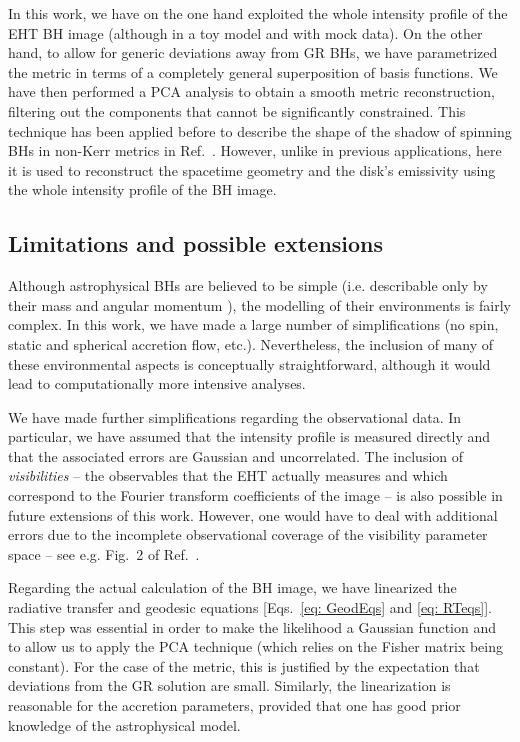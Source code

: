 \documentclass[%
nofootinbib,
 amsmath,amssymb,
 aps,
floatfix,
twocolumn
]{revtex4-2}
\begin{document}
In this work, we have on the one hand exploited the whole intensity profile of the EHT BH image (although in a toy model and with mock data). On the other hand, to
allow for generic deviations away from GR BHs, we have parametrized the metric in terms of a completely general superposition of basis functions. We have then performed a PCA analysis to obtain a smooth metric reconstruction, filtering out the components that cannot be significantly constrained. 
This technique has been applied before to describe the shape of the shadow of spinning BHs in non-Kerr metrics in Ref.~\cite{Medeiros:2019cde}. However, unlike in previous applications, here it is used to  reconstruct the spacetime geometry  and the disk's emissivity using the whole intensity profile of the BH image.

\subsection{Limitations and possible extensions}\label{discussion_limitations_and_extensions}

Although astrophysical BHs are believed to be simple (i.e. describable only by their mass and angular momentum \cite{Israel:1967wq, Hawking:1971vc, Carter:1971zc, Robinson:1975bv}), the modelling of their environments is fairly complex. In this work, we have made a large number of simplifications (no spin, static and spherical accretion flow, etc.). Nevertheless, the inclusion of many of these environmental aspects is conceptually straightforward, although it would lead to computationally more intensive analyses. 

We have made further simplifications regarding the observational data. In particular, we have assumed that the intensity profile is measured directly and that the associated errors are Gaussian and uncorrelated. The inclusion of \emph{visibilities} -- the observables that the EHT actually measures and which correspond to the Fourier transform coefficients of the image -- is also possible in future extensions of this work. 
However, one would have to 
 deal with additional errors due to the incomplete observational coverage of the visibility parameter space -- see e.g. Fig.~2 of Ref.~\cite{eht}.

Regarding the actual calculation of the BH image, we have  linearized the radiative transfer and geodesic equations [Eqs.~\eqref{eq: GeodEqs} and \eqref{eq: RTeqs}]. This step was essential in order to make the likelihood a Gaussian function and to allow us to apply the PCA technique (which relies on the Fisher matrix being constant). For the case of the metric, this is justified by the expectation that deviations from the GR solution are small. Similarly, the linearization
is reasonable for the
accretion parameters, provided that one has good prior knowledge of the astrophysical model. 
\end{document}

